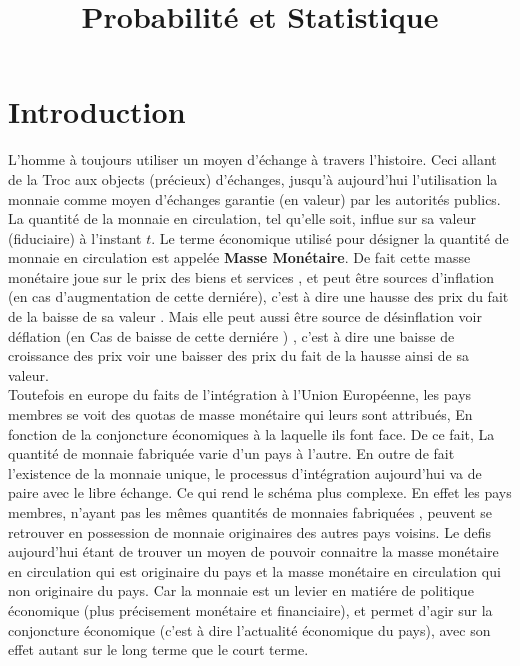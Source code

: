 \documentclass[11pt,]{article}
\title{Probabilité et Statistique}
\author{}
\date{}
\begin{document}
\maketitle

{
\setcounter{tocdepth}{6}
\tableofcontents
}
\newpage

\section{Introduction}\label{introduction}

L'homme à toujours utiliser un moyen d'échange à travers l'histoire.
Ceci allant de la Troc aux objects (précieux) d'échanges, jusqu'à
aujourd'hui l'utilisation la monnaie comme moyen d'échanges garantie (en
valeur) par les autorités publics. La quantité de la monnaie en
circulation, tel qu'elle soit, influe sur sa valeur (fiduciaire) à
l'instant \(t\). Le terme économique utilisé pour désigner la quantité
de monnaie en circulation est appelée \textbf{Masse Monétaire}. De fait
cette masse monétaire joue sur le prix des biens et services , et peut
être sources d'inflation (en cas d'augmentation de cette derniére),
c'est à dire une hausse des prix du fait de la baisse de sa valeur .
Mais elle peut aussi être source de désinflation voir déflation (en Cas
de baisse de cette derniére ) , c'est à dire une baisse de croissance
des prix voir une baisser des prix du fait de la hausse ainsi de sa
valeur.\\
Toutefois en europe du faits de l'intégration à l'Union Européenne, les
pays membres se voit des quotas de masse monétaire qui leurs sont
attribués, En fonction de la conjoncture économiques à la laquelle ils
font face. De ce fait, La quantité de monnaie fabriquée varie d'un pays
à l'autre. En outre de fait l'existence de la monnaie unique, le
processus d'intégration aujourd'hui va de paire avec le libre échange.
Ce qui rend le schéma plus complexe. En effet les pays membres, n'ayant
pas les mêmes quantités de monnaies fabriquées , peuvent se retrouver en
possession de monnaie originaires des autres pays voisins. Le defis
aujourd'hui étant de trouver un moyen de pouvoir connaitre la masse
monétaire en circulation qui est originaire du pays et la masse
monétaire en circulation qui non originaire du pays. Car la monnaie est
un levier en matiére de politique économique (plus précisement monétaire
et financiaire), et permet d'agir sur la conjoncture économique (c'est à
dire l'actualité économique du pays), avec son effet autant sur le long
terme que le court terme.\\
\end{document}
